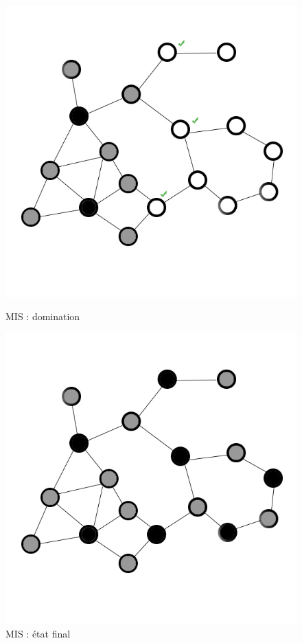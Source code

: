 \begin{figure}
   	\begin{minipage}[c]{.46\linewidth}
      	\includegraphics{images/mis5.jpg}
      	\caption{MIS : domination}
      	\label{mis5}
   	\end{minipage} \hfill
   	\begin{minipage}[c]{.46\linewidth}
      	\includegraphics{images/mis6.jpg}
		\caption{MIS : état final}
		\label{mis6}
   	\end{minipage}
\end{figure}

